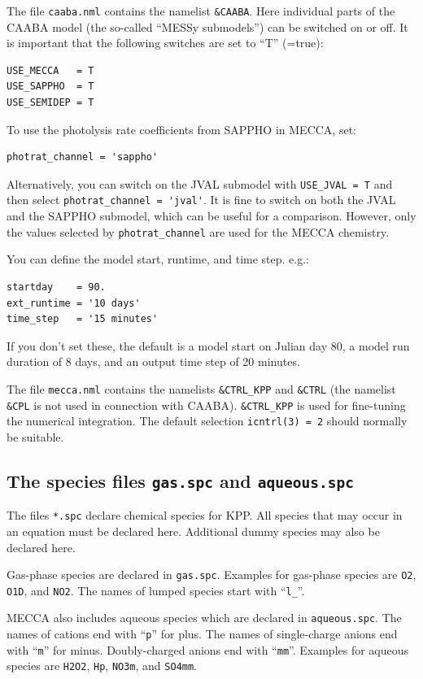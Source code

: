 \documentclass[twoside]{article}
\begin{document}
The file \verb|caaba.nml| contains the namelist \verb|&CAABA|. Here
individual parts of the CAABA model (the so-called ``MESSy submodels'')
can be switched on or off. It is important that the following switches
are set to ``T'' (=true):
\begin{verbatim}
USE_MECCA   = T
USE_SAPPHO  = T
USE_SEMIDEP = T
\end{verbatim}
To use the photolysis rate coefficients from SAPPHO in MECCA, set:
\begin{verbatim}
photrat_channel = 'sappho'
\end{verbatim}
Alternatively, you can switch on the JVAL submodel with
\verb|USE_JVAL = T| and then select \verb|photrat_channel = 'jval'|. It
is fine to switch on both the JVAL and the SAPPHO submodel, which can be
useful for a comparison. However, only the values selected by
\verb|photrat_channel| are used for the MECCA chemistry.

You can define the model start, runtime, and time step. e.g.:
\begin{verbatim}
startday    = 90.
ext_runtime = '10 days'
time_step   = '15 minutes'
\end{verbatim}
If you don't set these, the default is a model start on Julian day 80, a
model run duration of 8 days, and an output time step of 20 minutes.

The file \verb|mecca.nml| contains the namelists \verb|&CTRL_KPP| and
\verb|&CTRL| (the namelist \verb|&CPL| is not used in connection with
CAABA). \verb|&CTRL_KPP| is used for fine-tuning the numerical
integration. The default selection \verb|icntrl(3) = 2| should normally
be suitable.

\subsection{The species files {\tt gas.spc} and {\tt aqueous.spc}}
\label{sec:spcfiles}

The files \verb|*.spc| declare chemical species for KPP. All species
that may occur in an equation must be declared here. Additional dummy
species may also be declared here.

Gas-phase species are declared in \verb|gas.spc|. Examples for gas-phase
species are \verb|O2|, \verb|O1D|, and \verb|NO2|. The names of lumped
species start with ``\verb|l_|''.

MECCA also includes aqueous species which are declared in
\verb|aqueous.spc|. The names of cations end with ``\verb|p|'' for plus.
The names of single-charge anions end with ``\verb|m|'' for minus.
Doubly-charged anions end with ``\verb|mm|''. Examples for aqueous
species are \verb|H2O2|, \verb|Hp|, \verb|NO3m|, and \verb|SO4mm|.
\end{document}
